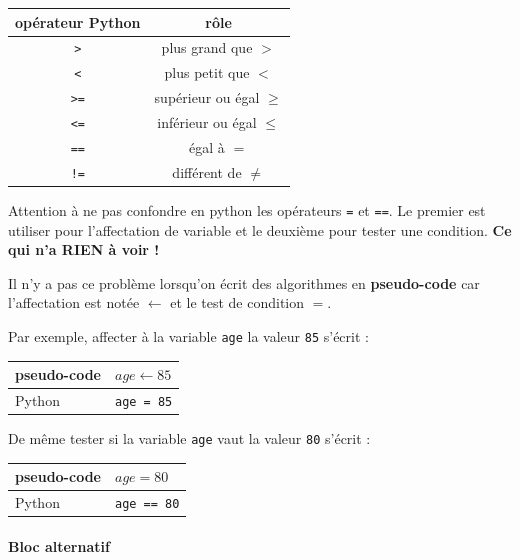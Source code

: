 \documentclass[a4paper,17pt]{extarticle}
\begin{document}
\begin{longtable}[]{@{}cc@{}}
\toprule
opérateur Python & rôle\tabularnewline
\midrule
\endhead
\texttt{\textgreater{}} & plus grand que \(>\)\tabularnewline
\texttt{\textless{}} & plus petit que \(<\)\tabularnewline
\texttt{\textgreater{}=} & supérieur ou égal \(\geq\)\tabularnewline
\texttt{\textless{}=} & inférieur ou égal \(\leq\)\tabularnewline
\texttt{==} & égal à \(=\)\tabularnewline
\texttt{!=} & différent de \(\neq\)\tabularnewline
\bottomrule
\end{longtable}
\begin{remarque}
    Attention à ne pas confondre en python les opérateurs \texttt{=} et
\texttt{==}. Le premier est utiliser pour l'affectation de variable et
le deuxième pour tester une condition. \textbf{Ce qui n'a RIEN à voir !}

Il n'y a pas ce problème lorsqu'on écrit des algorithmes en
\textbf{pseudo-code} car l'affectation est notée \(\leftarrow\) et le
test de condition \(=\).

Par exemple, affecter à la variable \texttt{age} la valeur \texttt{85}
s'écrit :

\begin{longtable}[]{@{}ll@{}}
\toprule
pseudo-code & \(age \leftarrow 85\)\tabularnewline
\midrule
\endhead
Python & \texttt{age\ =\ 85}\tabularnewline
\bottomrule
\end{longtable}

De même tester si la variable \texttt{age} vaut la valeur \texttt{80}
s'écrit :

\begin{longtable}[]{@{}ll@{}}
\toprule
pseudo-code & \(age = 80\)\tabularnewline
\midrule
\endhead
Python & \texttt{age\ ==\ 80}\tabularnewline
\bottomrule
\end{longtable}

        \end{remarque}
    \hypertarget{bloc-alternatif}{%
\paragraph{Bloc alternatif}\label{bloc-alternatif}}
\end{document}
